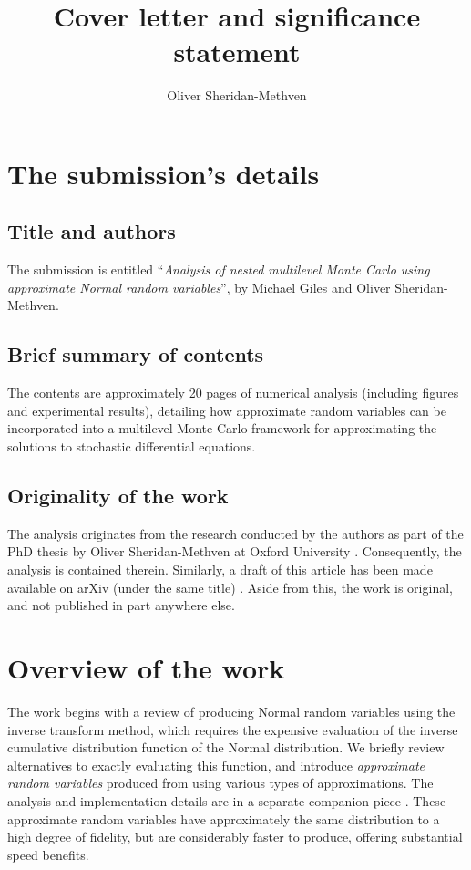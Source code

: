 \documentclass[twocolumn,10pt]{extarticle}
\title{Cover letter and significance statement}
\author{Oliver Sheridan-Methven}
\begin{document}
\maketitle


\section{The submission's details}

\subsection{Title and authors}
The submission is entitled ``\textit{Analysis of nested multilevel Monte Carlo using approximate Normal random variables}'', by Michael Giles and Oliver Sheridan-Methven.

\subsection{Brief summary of contents}
The contents are approximately 20 pages of numerical analysis (including figures and experimental results), detailing how approximate random variables can be incorporated into a multilevel Monte Carlo framework for approximating the solutions to stochastic differential equations.  

\subsection{Originality of the work}
The analysis originates from the research conducted by the authors as part of the PhD thesis by Oliver Sheridan-Methven at Oxford University \citep{sheridan-methven2020thesis}. Consequently, the analysis is contained therein. Similarly, a draft of this article has been made available on arXiv (under the same title) \citep{sheridanmethven2021analysis}. Aside from this, the work is original, and not published in part anywhere else. 

\section{Overview of the work}

The work begins with a review of producing Normal random variables using the inverse transform method, which requires the expensive evaluation of the inverse cumulative distribution function of the Normal distribution. We briefly review alternatives to exactly evaluating this function, and introduce \textit{approximate random variables} produced from using various types of approximations. The analysis and implementation details are in a separate companion piece \citep{sheridanmethven2020approximating}. These approximate random variables have approximately the same distribution to a high degree of fidelity, but are considerably faster to produce, offering substantial speed benefits. 
\end{document}

